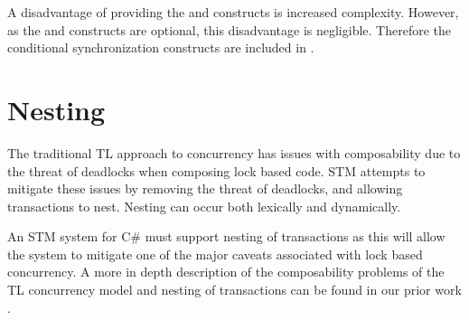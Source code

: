 A disadvantage of providing the  and  constructs is increased complexity. However, as the  and  constructs are optional, this disadvantage is negligible. Therefore the conditional synchronization constructs are included in \stmname.

\section{Nesting}
\label{sec:stm_req_nesting}
The traditional \acl{TL} approach to concurrency has issues with composability due to the threat of deadlocks when composing lock based code\cite[p. 58]{sutter2005software}. \ac{STM} attempts to mitigate these issues by removing the threat of deadlocks, and allowing transactions to nest. Nesting can occur both lexically and dynamically\cite[p. 1]{kumar2011hparstm}\cite[p. 42]{harris2010transactional}\cite[p. 2081]{herlihy2011tm}. 

%
%
%       
%
%
%       

An \ac{STM} system for C\# must support nesting of transactions as this will allow the system to mitigate one of the major caveats associated with lock based concurrency. A more in depth description of the composability problems of the \ac{TL} concurrency model and nesting of transactions can be found in our prior work \cite{dpt907e14trending}.

